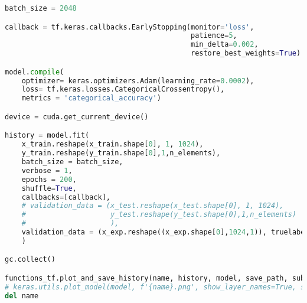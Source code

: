 \begin{lstlisting}[language=Python]
batch_size = 2048

callback = tf.keras.callbacks.EarlyStopping(monitor='loss', 
                                            patience=5, 
                                            min_delta=0.002,
                                            restore_best_weights=True)

model.compile(
    optimizer= keras.optimizers.Adam(learning_rate=0.0002),
    loss= tf.keras.losses.CategoricalCrossentropy(),
    metrics = 'categorical_accuracy')

device = cuda.get_current_device()

history = model.fit(
    x_train.reshape(x_train.shape[0], 1, 1024),
    y_train.reshape(y_train.shape[0],1,n_elements),
    batch_size = batch_size,
    verbose = 1,
    epochs = 200,
    shuffle=True,
    callbacks=[callback],
    # validation_data = (x_test.reshape(x_test.shape[0], 1, 1024),
    #                    y_test.reshape(y_test.shape[0],1,n_elements)
    #                    ),
    validation_data = (x_exp.reshape((x_exp.shape[0],1024,1)), truelabels.reshape(213, 81)),
    )

gc.collect()

functions_tf.plot_and_save_history(name, history, model, save_path, subfolder=subfolder)
# keras.utils.plot_model(model, f'{name}.png', show_layer_names=True, show_layer_activations=True, show_shapes=True)
del name
\end{lstlisting}

